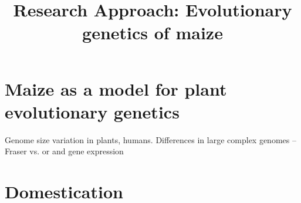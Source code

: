 \documentclass[11pt]{article}
\begin{document}
\title{\vspace{-5ex}Research Approach: Evolutionary genetics of maize\vspace{-4ex}}
\author{}
\date{}
\maketitle



\section*{Maize as a model for plant evolutionary genetics}

Genome size variation in plants, humans. 
Differences in large complex genomes -- Fraser \citep{fraser2013gene} vs. \citep{pyhajarvi2013complex} or \citep{hancock2011adaptation} and gene expression \citep{hufford2012comparative}



\section*{Domestication}
\end{document}
